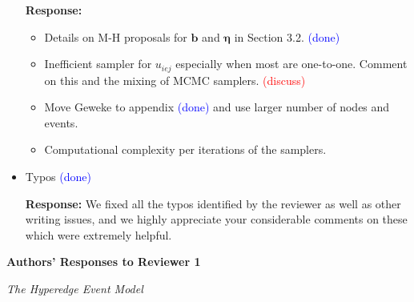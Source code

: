 \documentclass[12pt]{article}
\theoremstyle{definition}
\begin{document}
\begin{itemize}
		\textbf{  Response:} 
		\begin{itemize}
			\item Details on M-H proposals for $\boldsymbol{b}$ and $\boldsymbol{\eta}$ in Section 3.2. \textcolor{blue}{(done)}
			\item Inefficient sampler for $u_{iej}$ especially when most are one-to-one. Comment on this and the mixing of MCMC samplers.  \textcolor{red}{(discuss)} 
			\item Move Geweke to appendix \textcolor{blue}{(done)} and use larger number of nodes and events.
			\item Computational complexity per iterations of the samplers.
		\end{itemize}
		
	\item Typos \textcolor{blue}{(done)}
	
		\textbf{  Response:} We fixed all the typos identified by the reviewer as well as other writing issues, and we highly appreciate your considerable comments on these which were extremely helpful.
\end{itemize}

\newpage


\begin{center}

\textbf{Authors' Responses to Reviewer 1}
\end{center}
\begin{center}
\textsl{The Hyperedge Event Model}
\end{center}
\end{document}
